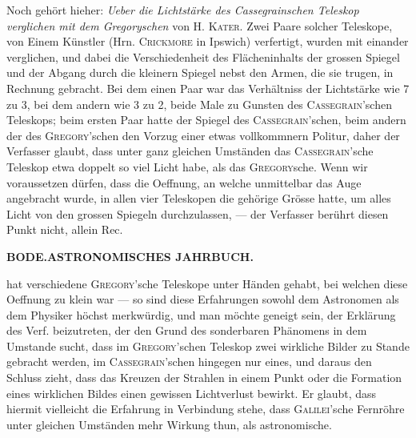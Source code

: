 Noch gehört hieher: \emph{Ueber die Lichtstärke des Cassegrainschen Teleskop verglichen mit dem Gregoryschen} von H. \textsc{Kater}. Zwei Paare solcher Teleskope, von Einem Künstler (Hrn. \textsc{Crickmore} in Ipswich) verfertigt, wurden mit einander verglichen, und dabei die Verschiedenheit des Flächeninhalts der grossen Spiegel und der Abgang durch die kleinern Spiegel nebst den Armen, die sie trugen, in Rechnung gebracht. Bei dem einen Paar war das Verhältniss der Lichtstärke wie 7 zu 3, bei dem andern wie 3 zu 2, beide Male zu Gunsten des \textsc{Cassegrain}'schen Teleskops; beim ersten Paar hatte der Spiegel des \textsc{Cassegrain}'schen, beim andern der des \textsc{Gregory}'schen den Vorzug einer etwas vollkommnern Politur, daher der Verfasser glaubt, dass unter ganz gleichen Umständen das \textsc{Cassegrain}'sche Teleskop etwa doppelt so viel Licht habe, als das \textsc{Gregory}sche. Wenn wir voraussetzen dürfen, dass die Oeffnung, an welche unmittelbar das Auge angebracht wurde, in allen vier Teleskopen die gehörige Grösse hatte, um alles Licht von den grossen Spiegeln durchzulassen, — der Verfasser berührt diesen Punkt nicht, allein Rec.\par
\clearpage
\thispagestyle{empty}
\noindent{}%
\makebox[12mm][l]{}%
\parbox[t]{\dimexpr\linewidth-24mm\relax}{\centering\footnotesize\bfseries BODE.\enspace ASTRONOMISCHES JAHRBUCH.\par}%
\par\nobreak\medskip
\noindent hat verschiedene \textsc{Gregory}'sche Teleskope unter Händen gehabt, bei welchen diese Oeffnung zu klein war — so sind diese Erfahrungen sowohl dem Astronomen als dem Physiker höchst merkwürdig, und man möchte geneigt sein, der Erklärung des Verf. beizutreten, der den Grund des sonderbaren Phänomens in dem Umstande sucht, dass im \textsc{Gregory}'schen Teleskop zwei wirkliche Bilder zu Stande gebracht werden, im \textsc{Cassegrain}'schen hingegen nur eines, und daraus den Schluss zieht, dass das Kreuzen der Strahlen in einem Punkt oder die Formation eines wirklichen Bildes einen gewissen Lichtverlust bewirkt. Er glaubt, dass hiermit vielleicht die Erfahrung in Verbindung stehe, dass \textsc{Galilei}'sche Fernröhre unter gleichen Umständen mehr Wirkung thun, als astronomische.
